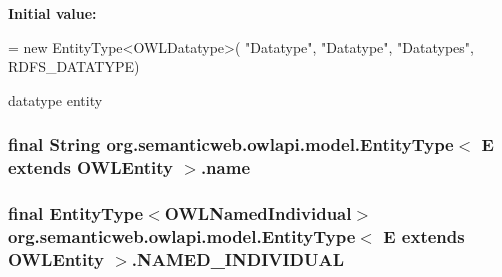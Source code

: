 {\bfseries Initial value\-:}
\begin{DoxyCode}
= \textcolor{keyword}{new} EntityType<OWLDatatype>(
            \textcolor{stringliteral}{"Datatype"}, \textcolor{stringliteral}{"Datatype"}, \textcolor{stringliteral}{"Datatypes"}, RDFS\_DATATYPE)
\end{DoxyCode}
datatype entity \hypertarget{classorg_1_1semanticweb_1_1owlapi_1_1model_1_1_entity_type_3_01_e_01extends_01_o_w_l_entity_01_4_a13b25f4f2a82f64e5cdb4ed0d60f6c6b}{
\subsubsection[{name}]{\setlength{\rightskip}{0pt plus 5cm}final String org.\-semanticweb.\-owlapi.\-model.\-Entity\-Type$<$ E extends {\bf O\-W\-L\-Entity} $>$.name\hspace{0.3cm}{\ttfamily [private]}}}\label{classorg_1_1semanticweb_1_1owlapi_1_1model_1_1_entity_type_3_01_e_01extends_01_o_w_l_entity_01_4_a13b25f4f2a82f64e5cdb4ed0d60f6c6b}
\hypertarget{classorg_1_1semanticweb_1_1owlapi_1_1model_1_1_entity_type_3_01_e_01extends_01_o_w_l_entity_01_4_ab5bf3a79831be3ece9395e59d45b58d1}{
\subsubsection[{N\-A\-M\-E\-D\-\_\-\-I\-N\-D\-I\-V\-I\-D\-U\-A\-L}]{\setlength{\rightskip}{0pt plus 5cm}final {\bf Entity\-Type}$<${\bf O\-W\-L\-Named\-Individual}$>$ org.\-semanticweb.\-owlapi.\-model.\-Entity\-Type$<$ E extends {\bf O\-W\-L\-Entity} $>$.N\-A\-M\-E\-D\-\_\-\-I\-N\-D\-I\-V\-I\-D\-U\-A\-L\hspace{0.3cm}{\ttfamily [static]}}}\label{classorg_1_1semanticweb_1_1owlapi_1_1model_1_1_entity_type_3_01_e_01extends_01_o_w_l_entity_01_4_ab5bf3a79831be3ece9395e59d45b58d1}
